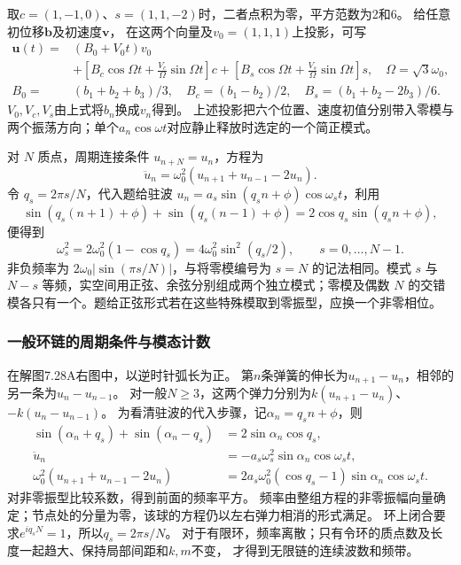 \documentclass[UTF8,fontset=fandol,a4paper,11pt]{ctexart}
\begin{document}
取$c=(1,-1,0)$、$s=(1,1,-2)$时，二者点积为零，平方范数为2和6。
给任意初位移$\boldsymbol b$及初速度$\boldsymbol v$，
在这两个向量及$v_0=(1,1,1)$上投影，可写
\[
\begin{aligned}
\boldsymbol u(t)={}&(B_0+V_0t)v_0\\
&+\left[B_c\cos\Omega t+\frac{V_c}{\Omega}\sin\Omega t\right]c
+\left[B_s\cos\Omega t+\frac{V_s}{\Omega}\sin\Omega t\right]s,
\quad\Omega=\sqrt3\omega_0,\\
B_0={}&(b_1+b_2+b_3)/3,\quad B_c=(b_1-b_2)/2,\quad
B_s=(b_1+b_2-2b_3)/6.
\end{aligned}
\]
$V_0,V_c,V_s$由上式将$b_n$换成$v_n$得到。
上述投影把六个位置、速度初值分别带入零模与两个振荡方向；单个$a_n\cos\omega t$对应静止释放时选定的一个简正模式。

对 $N$ 质点，周期连接条件 $u_{n+N}=u_n$，方程为
\[\ddot u_n=\omega_0^2(u_{n+1}+u_{n-1}-2u_n).\]
令 $q_s=2\pi s/N$，代入题给驻波 $u_n=a_s\sin(q_sn+\phi)\cos\omega_st$，利用
\[\sin(q_s(n+1)+\phi)+\sin(q_s(n-1)+\phi)
=2\cos q_s\sin(q_sn+\phi),\]
便得到
\[\boxed{\omega_s^2=2\omega_0^2(1-\cos q_s)
=4\omega_0^2\sin^2(q_s/2),\qquad s=0,\ldots,N-1.}\]
非负频率为 $2\omega_0|\sin(\pi s/N)|$，与将零模编号为 $s=N$ 的记法相同。模式 $s$ 与 $N-s$ 等频，实空间用正弦、余弦分别组成两个独立模式；零模及偶数 $N$ 的交错模各只有一个。题给正弦形式若在这些特殊模取到零振型，应换一个非零相位。

\subsubsection*{一般环链的周期条件与模态计数}
在解图7.28A右图中，以逆时针弧长为正。
第$n$条弹簧的伸长为$u_{n+1}-u_n$，相邻的另一条为$u_n-u_{n-1}$。
对一般$N\ge3$，这两个弹力分别为$k(u_{n+1}-u_n)$、$-k(u_n-u_{n-1})$。
为看清驻波的代入步骤，记$\alpha_n=q_sn+\phi$，则
\[
\begin{aligned}
\sin(\alpha_n+q_s)+\sin(\alpha_n-q_s)
&=2\sin\alpha_n\cos q_s,\\
\ddot u_n&=-a_s\omega_s^2\sin\alpha_n\cos\omega_st,\\
\omega_0^2(u_{n+1}+u_{n-1}-2u_n)
&=2a_s\omega_0^2(\cos q_s-1)\sin\alpha_n\cos\omega_st.
\end{aligned}
\]
对非零振型比较系数，得到前面的频率平方。
频率由整组方程的非零振幅向量确定；节点处的分量为零，该球的方程仍以左右弹力相消的形式满足。
环上闭合要求$e^{iq_sN}=1$，所以$q_s=2\pi s/N$。
对于有限环，频率离散；只有令环的质点数及长度一起趋大、保持局部间距和$k,m$不变，
才得到无限链的连续波数和频带。
\end{document}
